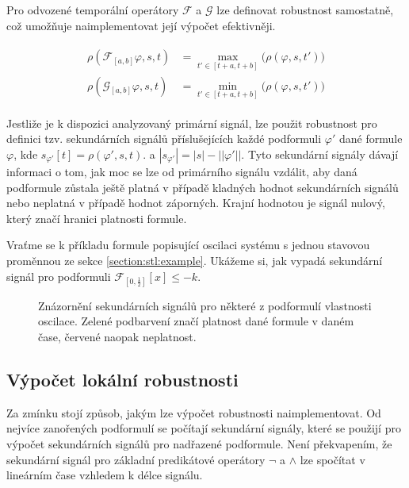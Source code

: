 Pro odvozené temporální operátory $\mathcal{F}$ a $\mathcal{G}$ lze definovat robustnost
samostatně, což umožňuje naimplementovat její výpočet efektivněji.

\begin{align}\label{eq:stl:semantics}
\begin{array}{ll}
\rho(\mathcal{F}_{[a, b]}\varphi, s, t)		&= {\displaystyle \max_{t' \in [t + a, t + b]}} \Big(\rho(\varphi, s, t')\Big)		\\
\rho(\mathcal{G}_{[a, b]}\varphi, s, t)		&= {\displaystyle \min_{t' \in [t + a, t + b]}} \Big(\rho(\varphi, s, t')\Big)		
\end{array}
\end{align}

Jestliže je k dispozici analyzovaný primární signál, lze použit robustnost pro definici tzv. sekundárních
signálů příslušejících každé podformuli $\varphi'$ dané formule $\varphi$, kde $s_{\varphi'}[t] = \rho(\varphi', s, t)$.
a $|s_{\varphi'}| = |s| - ||\varphi'||$. Tyto se\-kun\-dár\-ní signály dávají informaci o tom, jak moc se lze od primárního
signálu vzdálit, aby daná podformule zůstala ještě platná v případě klad\-ných hodnot sekundárních signálů
nebo neplatná v případě hodnot zá\-por\-ných. Krajní hodnotou je signál nulový, který značí hranici platnosti formule.

Vraťme se k příkladu formule popisující oscilaci systému s jednou stavovou proměnnou ze 
sekce \ref{section:stl:example}. Ukážeme si, jak vypadá sekundární signál pro podformuli
$\mathcal{F}_{[0, \frac{1}{2}]}[x] \leq -k$.

\begin{figure}[h!]
\begin{center}
\caption{Znázornění sekundárních signálů pro některé z podformulí vlastnosti oscilace. Zelené podbarvení
značí platnost dané formule v daném čase, červené naopak neplatnost.}
\end{center}
\end{figure}

\subsection{Výpočet lokální robustnosti}

Za zmínku stojí způsob, jakým lze výpočet robustnosti naimplementovat. Od nejvíce zanořených
podformulí se počítají sekundární signály, které se použijí pro výpočet sekundárních signálů
pro nadřazené podformule. Není překvapením, že sekundární signál pro základní predikátové operátory
$\neg$ a $\wedge$ lze spočítat v lineárním čase vzhledem k délce signálu.

